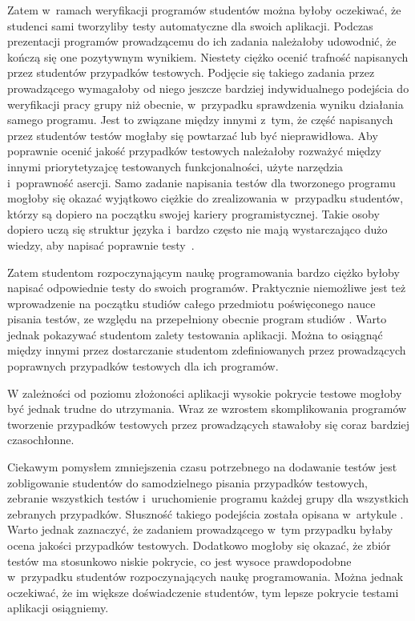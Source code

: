 Zatem w~ramach weryfikacji programów studentów można byłoby oczekiwać, że studenci sami tworzyliby testy automatyczne dla swoich aplikacji.
Podczas prezentacji programów prowadzącemu do ich zadania należałoby udowodnić, że kończą się one pozytywnym wynikiem.
Niestety ciężko ocenić trafność napisanych przez studentów przypadków testowych.
Podjęcie się takiego zadania przez prowadzącego wymagałoby od niego jeszcze bardziej indywidualnego podejścia do weryfikacji pracy grupy niż obecnie, w~przypadku sprawdzenia wyniku działania samego programu.
Jest to związane między innymi z~tym, że część napisanych przez studentów testów mogłaby się powtarzać lub być nieprawidłowa.
Aby poprawnie ocenić jakość przypadków testowych należałoby rozważyć  między innymi priorytetyzajcę testowanych funkcjonalności, użyte narzędzia i~poprawność asercji.
Samo zadanie napisania testów dla tworzonego programu mogłoby się okazać wyjątkowo ciężkie do zrealizowania w~przypadku studentów, którzy są dopiero na początku swojej kariery programistycznej.
Takie osoby dopiero uczą się struktur języka i~bardzo często nie mają wystarczająco dużo wiedzy, aby napisać poprawnie testy~\cite{tests-and-begginers}.

Zatem studentom rozpoczynającym naukę programowania bardzo ciężko byłoby napisać odpowiednie testy do swoich programów.
Praktycznie niemożliwe jest też wprowadzenie na początku studiów całego przedmiotu poświęconego nauce pisania testów, ze względu na przepełniony obecnie program studiów \cite{overflow-studies-program}.
Warto jednak pokazywać studentom zalety testowania aplikacji.
Można to osiągnąć między innymi przez dostarczanie studentom zdefiniowanych przez prowadzących poprawnych przypadków testowych dla ich programów.

W zależności od poziomu złożoności aplikacji wysokie pokrycie testowe mogłoby być jednak trudne do utrzymania.
Wraz ze wzrostem skomplikowania programów tworzenie przypadków testowych przez prowadzących stawałoby się coraz bardziej czasochłonne.

Ciekawym pomysłem zmniejszenia czasu potrzebnego na dodawanie testów jest zobligowanie studentów do samodzielnego pisania przypadków testowych, zebranie wszystkich testów i~uruchomienie programu każdej grupy dla wszystkich zebranych przypadków.
Słuszność takiego podejścia została opisana w~artykule \cite{write-tests-by-students}.
Warto jednak zaznaczyć, że zadaniem prowadzącego w~tym przypadku byłaby ocena jakości przypadków testowych.
Dodatkowo mogłoby się okazać, że zbiór testów ma stosunkowo niskie pokrycie, co jest wysoce prawdopodobne w~przypadku studentów rozpoczynających naukę programowania.
Można jednak oczekiwać, że im większe doświadczenie studentów, tym lepsze pokrycie testami aplikacji osiągniemy.

